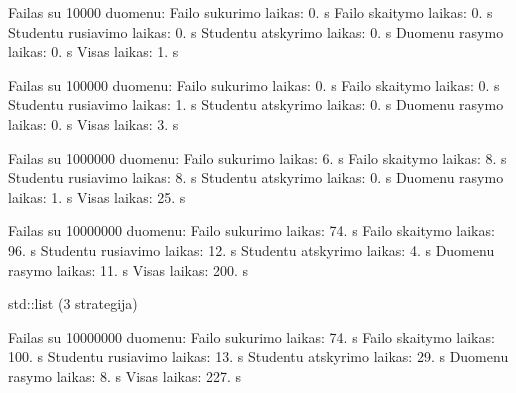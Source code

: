 Failas su 10000 duomenu\+: Failo sukurimo laikas\+: 0. s Failo skaitymo laikas\+: 0. s Studentu rusiavimo laikas\+: 0. s Studentu atskyrimo laikas\+: 0. s Duomenu rasymo laikas\+: 0. s Visas laikas\+: 1. s

Failas su 100000 duomenu\+: Failo sukurimo laikas\+: 0. s Failo skaitymo laikas\+: 0. s Studentu rusiavimo laikas\+: 1. s Studentu atskyrimo laikas\+: 0. s Duomenu rasymo laikas\+: 0. s Visas laikas\+: 3. s

Failas su 1000000 duomenu\+: Failo sukurimo laikas\+: 6. s Failo skaitymo laikas\+: 8. s Studentu rusiavimo laikas\+: 8. s Studentu atskyrimo laikas\+: 0. s Duomenu rasymo laikas\+: 1. s Visas laikas\+: 25. s

Failas su 10000000 duomenu\+: Failo sukurimo laikas\+: 74. s Failo skaitymo laikas\+: 96. s Studentu rusiavimo laikas\+: 12. s Studentu atskyrimo laikas\+: 4. s Duomenu rasymo laikas\+: 11. s Visas laikas\+: 200. s

std\+::list (3 strategija)

Failas su 10000000 duomenu\+: Failo sukurimo laikas\+: 74. s Failo skaitymo laikas\+: 100. s Studentu rusiavimo laikas\+: 13. s Studentu atskyrimo laikas\+: 29. s Duomenu rasymo laikas\+: 8. s Visas laikas\+: 227. s 